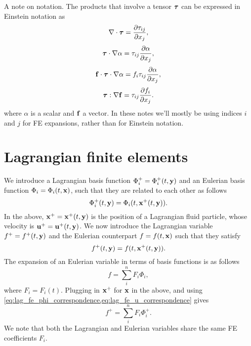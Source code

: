 \documentclass[11pt]{article}
\begin{document}
A note on notation. The products that involve a tensor $\bm \tau$ can be expressed in Einstein notation as
\begin{equation}
    \nabla \cdot \bm \tau = \frac{\partial \tau_{ij}}{\partial x_j},
\end{equation}
\begin{equation}
    \bm \tau \cdot \nabla \alpha = \tau_{ij} \frac{\partial \alpha}{\partial x_j},
\end{equation}
\begin{equation}
    \mathbf{f} \cdot \bm \tau \cdot \nabla \alpha = f_i \tau_{ij} \frac{\partial \alpha}{\partial x_j},
\end{equation}
\begin{equation}
    \bm \tau : \nabla \mathbf{f} = \tau_{ij} \frac{\partial f_i}{\partial x_j}.
\end{equation}
where $\alpha$ is a scalar and $\mathbf{f}$ a vector. In these notes we'll mostly be using indices $i$ and $j$ for FE expansions, rather than for Einstein notation.

\section{Lagrangian finite elements}
We introduce a Lagrangian basis function $\Phi_i^+ = \Phi_i^+(t,\mathbf{y})$ and an Eulerian basis function $\Phi_i = \Phi_i(t,\mathbf{x})$, such that they are related to each other as follows
\begin{equation}
    \label{eq:lag_fe_phi_correspondence}
    \Phi_i^+(t,\mathbf{y}) = \Phi_i(t,\mathbf{x}^+(t,\mathbf{y})).
\end{equation}
In the above, $\mathbf{x}^+ = \mathbf{x}^+(t,\mathbf{y})$ is the position of a Lagrangian fluid particle, whose velocity is $\mathbf{u}^+ = \mathbf{u}^+(t,\mathbf{y})$. We now introduce the Lagrangian variable $f^+ = f^+(t,\mathbf{y})$ and the Eulerian counterpart $f = f(t,\mathbf{x})$ such that they satisfy
\begin{equation}
    \label{eq:lag_fe_u_correspondence}
    f^+(t,\mathbf{y}) = f(t,\mathbf{x}^+(t,\mathbf{y})).
\end{equation}
The expansion of an Eulerian variable in terms of basis functions is as follows
\begin{equation}
    \label{eq:lag_fe_expansion_eul}
    f = \sum_i^n F_i \Phi_i,
\end{equation}
where $F_i = F_i(t)$. Plugging in $\mathbf{x}^+$ for $\mathbf{x}$ in the above, and using \cref{eq:lag_fe_phi_correspondence,eq:lag_fe_u_correspondence} gives
\begin{equation}
    \label{eq:fe_lag_expansion_lag}
    f^+ = \sum_i^n F_i \Phi_i^+.
\end{equation}
We note that both the Lagrangian and Eulerian variables share the same FE coefficients $F_i$. 
\end{document}
